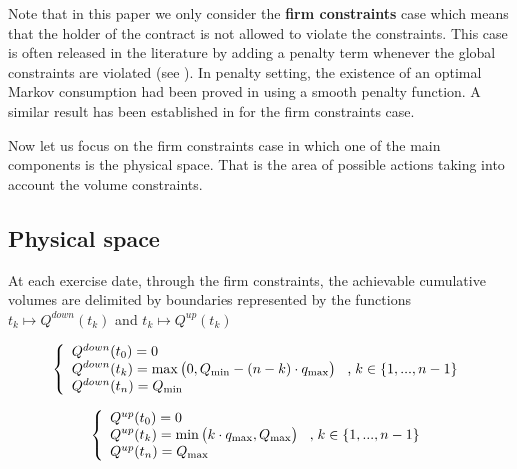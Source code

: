 \documentclass{article}
\numberwithin{equation}{section}
\begin{document}
Note that in this paper we only consider the \textbf{firm constraints} case which means that the holder of the contract is not allowed to violate the constraints. This case is often released in the literature by adding a penalty term whenever the global constraints are violated (see \cite{Bardou2009OptimalQF, BarreraEsteve2006NumericalMF}). In penalty setting, the existence of an optimal Markov consumption had been proved in \cite{BarreraEsteve2006NumericalMF} using a smooth penalty function. A similar result has been established in \cite{Bardou2007WhenAS} for the firm constraints case.



Now let us focus on the firm constraints case in which one of the main components is the physical space. That is the area of possible actions taking into account the volume constraints.


\subsection{Physical space}
\label{physical_space}

\indent

At each exercise date, through the firm constraints, the achievable cumulative volumes are delimited by boundaries represented by the functions $t_k \mapsto Q^{down}(t_k)$ and $t_k \mapsto Q^{up}(t_k)$

\vspace{0.1cm}

\begin{equation}
\left\{
    \begin{array}{ll}
        Q^{down}(t_0) = 0\\
        \displaystyle Q^{down}(t_k) = \max\big(0, Q_{\min} - (n-k) \cdot q_{\max} \big) \hspace{0.3cm} \text{,} \hspace{0.1cm} k \in \{1,...,n-1\} \\
        Q^{down}(t_n) = Q_{\min}
    \end{array}
\right.
\end{equation}

\vspace{0.1cm}

\begin{equation}
\left\{
    \begin{array}{ll}
        Q^{up}(t_0) = 0\\
        \displaystyle Q^{up}(t_k) = \min\big(k \cdot q_{\max}, Q_{\max}\big) \hspace{0.3cm} \text{,} \hspace{0.1cm} k  \in \{1,...,n-1\}\\
        Q^{up}(t_n) = Q_{\max}
    \end{array}
\right.
\end{equation}
\end{document}
